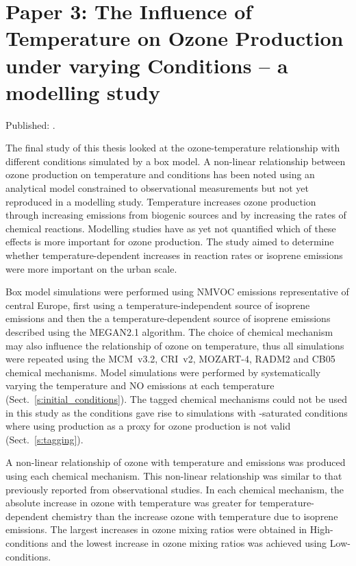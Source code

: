 \singlespacing
\section[Paper 3]{Paper 3: The Influence of Temperature on Ozone Production under varying  Conditions -- a modelling study} \label{s:T-O3_results}
\onehalfspacing

Published: .
\vspace{5mm}

The final study of this thesis looked at the ozone-temperature relationship with different  conditions simulated by a box model.
A non-linear relationship between ozone production on temperature and  conditions has been noted using an analytical model constrained to observational measurements but not yet reproduced in a modelling study.
Temperature increases ozone production through increasing emissions from biogenic sources and by increasing the rates of chemical reactions.
Modelling studies have as yet not quantified which of these effects is more important for ozone production.
The study aimed to determine whether temperature-dependent increases in reaction rates or isoprene emissions were more important on the urban scale.

Box model simulations were performed using NMVOC emissions representative of central Europe, first using a temperature-independent source of isoprene emissions and then the a temperature-dependent source of isoprene emissions described using the MEGAN2.1 algorithm.
The choice of chemical mechanism may also influence the relationship of ozone on temperature, thus all simulations were repeated using the MCM~v3.2, CRI~v2, MOZART-4, RADM2 and CB05 chemical mechanisms.
Model simulations were performed by systematically varying the temperature and NO emissions at each temperature (Sect.~\ref{s:initial_conditions}).
The tagged chemical mechanisms could not be used in this study as the  conditions gave rise to simulations with -saturated conditions where using  production as a proxy for ozone production is not valid (Sect.~\ref{s:tagging}).

A non-linear relationship of ozone with temperature and  emissions was produced using each chemical mechanism. 
This non-linear relationship was similar to that previously reported from observational studies.  
In each chemical mechanism, the absolute increase in ozone with temperature was greater for temperature-dependent chemistry than the increase ozone with temperature due to isoprene emissions.
The largest increases in ozone mixing ratios were obtained in High- conditions and the lowest increase in ozone mixing ratios was achieved using Low- conditions.

